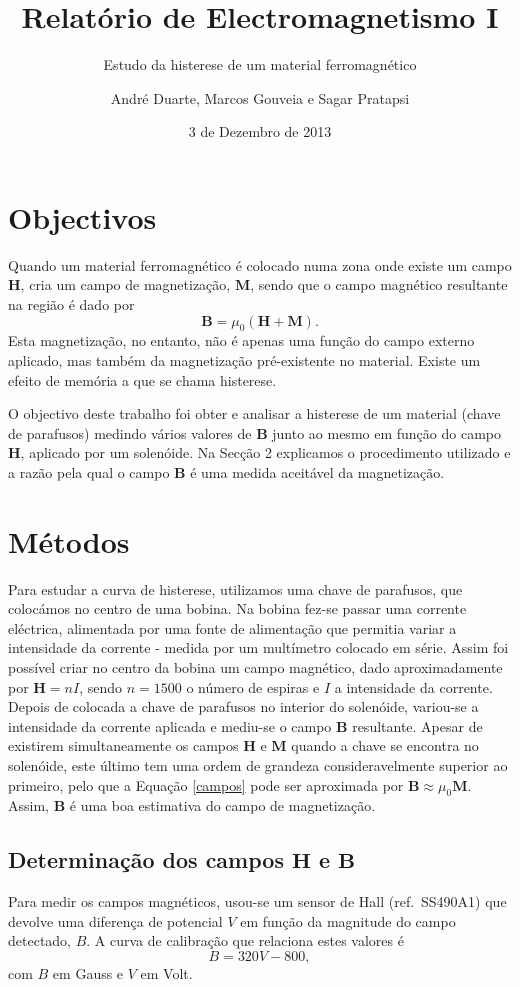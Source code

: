 \documentclass[a4paper]{article}
\title{Relatório de Electromagnetismo I}
\subtitle{Estudo da histerese de um material ferromagnético}
\author{André Duarte, Marcos Gouveia e Sagar Pratapsi}
\date{3 de Dezembro de 2013}
\begin{document}
\maketitle

\section{Objectivos}
Quando um material ferromagnético é colocado numa zona onde existe um campo $\mathbf{H}$, cria um campo de magnetização, $\mathbf{M}$, sendo que o campo magnético resultante na região é dado por \begin{equation}\label{campos} \mathbf{B}=\mu_0\left( \mathbf{H}+\mathbf{M}\right).\end{equation} Esta magnetização, no entanto, não é apenas uma função do campo externo aplicado, mas também da magnetização pré-existente no material. Existe um efeito de memória a que se chama histerese. 

O objectivo deste trabalho foi obter e analisar a histerese de um material (chave de parafusos) medindo vários valores de $\mathbf{B}$ junto ao mesmo em função do campo $\mathbf{H}$, aplicado por um solenóide. Na Secção 2 explicamos o procedimento utilizado e a razão pela qual o campo $\mathbf{B}$ é uma medida aceitável da magnetização.
\section{Métodos}
Para estudar a curva de histerese, utilizamos uma chave de parafusos, que colocámos no centro de uma bobina. Na bobina fez-se passar uma corrente eléctrica, alimentada por uma fonte de alimentação que permitia variar a intensidade da corrente - medida por um multímetro colocado em série. Assim foi possível criar no centro da bobina um campo magnético, dado aproximadamente por $\mathbf{H}=nI$, sendo $n=1500$ o número de espiras e $I$ a intensidade da corrente. Depois de colocada a chave de parafusos no interior do solenóide, variou-se a intensidade da corrente aplicada e mediu-se o campo $\mathbf{B}$ resultante. Apesar de existirem simultaneamente os campos $\mathbf{H}$ e $\mathbf{M}$ quando a chave se encontra no solenóide, este último tem uma ordem de grandeza consideravelmente superior ao primeiro, pelo que a Equação \ref{campos} pode ser aproximada por $\mathbf{B} \approx \mu_0 \mathbf{M}$. Assim, $\mathbf{B}$ é uma boa estimativa do campo de magnetização.

\subsection{Determinação dos campos $ \mathbf{H}$ e $ \mathbf{B}$}
Para medir os campos magnéticos, usou-se um sensor de Hall (ref.\ SS490A1) que devolve uma diferença de potencial $V$ em função da magnitude do campo detectado, $B$. A curva de calibração que relaciona estes valores é \begin{equation}\label{calibracao}B=320V-800,\end{equation}
com $B$ em Gauss e $V$ em Volt.
\end{document}
